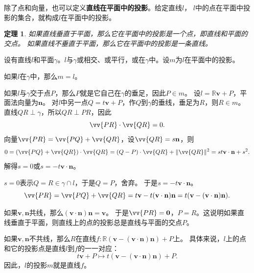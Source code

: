 \documentclass[12pt,UTF8]{ctexbook}
\newtheorem{tm}{定理}[section]
\begin{document}
除了点和向量，也可以定义\textbf{直线在平面中的投影}。给定直线$l$，
$l$中的点在平面中投影的集合，就构成$l$在平面中的投影。
\begin{tm}\label{tm:1-3-55}
    如果直线垂直于平面，那么它在平面中的投影是一个点，即直线和平面的交点。
    如果直线不垂直于平面，那么它在平面中的投影是一条直线。    
\end{tm}
\begin{proof2}
    设有直线$l$和平面$\gamma$。$l$与$\gamma$或相交、或平行，或在$\gamma$中。设$m$为$l$在平面中的投影。

    如果$l$在$\gamma$中，那么$m=l$。

    如果$l$与$\gamma$交于点$P$，那么$P$就是它自己在$\gamma$的垂足，因此$P\in m$。
    设$l=\mathbb{R}\mathbf{v}+P$，平面法向量为$\mathbf{n}$。
    对$l$中另一点$Q = t\mathbf{v}+P$，作$Q$到$\gamma$的垂线，垂足为$R$，则$R\in m$。
    直线$QR\perp\gamma$，所以$QR\perp PR$，因此
    $$ \vv{PR}\cdot\vv{QR} = 0.$$
    向量$\vv{PR} = \vv{PQ} + \vv{QR}$，设$\vv{QR} = s\mathbf{n}$，则
    $$ 0 = (\vv{PQ} + \vv{QR})\cdot\vv{QR} = (Q - P) \cdot\vv{QR} + \|\vv{QR}\|^2 = st\mathbf{v}\cdot\mathbf{n} + s^2. $$
    解得$s=0$或$s = -t\mathbf{v}\cdot\mathbf{n}$。
    
    $s=0$表示$Q=R\in \gamma\cap l$，于是$Q=P$，舍弃。
    于是$s = -t\mathbf{v}\cdot\mathbf{n}$。
    $$\vv{PR} = \vv{PQ} + \vv{QR} = t\mathbf{v} -t(\mathbf{v}\cdot\mathbf{n})\mathbf{n} = t(\mathbf{v} - (\mathbf{v}\cdot\mathbf{n})\mathbf{n}). $$
    
    如果$\mathbf{v}, \mathbf{n}$共线，那么$(\mathbf{v}\cdot\mathbf{n})\mathbf{n} = \mathbf{v}$。
    于是$\vv{PR} = \mathbf{0}$，$P = R$。这说明如果直线垂直于平面，则直线上的点的投影总是直线与平面的交点$P$。

    如果$\mathbf{v},\mathbf{n}$不共线，那么$R$在直线$f:\mathbb{R}(\mathbf{v} - (\mathbf{v}\cdot\mathbf{n})\mathbf{n}) + P$上。
    具体来说，$l$上的点和它的投影点是直线$l$到$f$的一一对应：
    $$ t\mathbf{v}+P \mapsto t(\mathbf{v} - (\mathbf{v}\cdot\mathbf{n})\mathbf{n}) + P.$$
    因此，$l$的投影$m$就是直线$f$。
    
\end{proof2}
\end{document}
